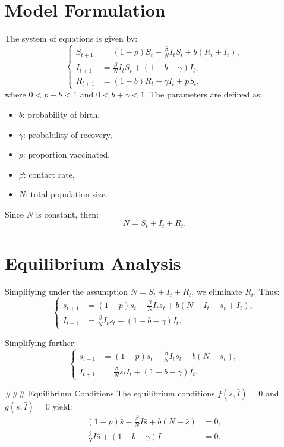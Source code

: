 \documentclass[10pt]{article}
\begin{document}
\section*{Model Formulation}

The system of equations is given by:
\[
\left\{
\begin{aligned}
S_{t+1} &= (1-p)S_t - \frac{\beta}{N}I_t S_t + b(R_t + I_t), \\
I_{t+1} &= \frac{\beta}{N}I_t S_t + (1-b-\gamma)I_t, \\
R_{t+1} &= (1-b)R_t + \gamma I_t + pS_t,
\end{aligned}
\right.
\]
where \( 0 < p+b < 1 \) and \( 0 < b + \gamma < 1 \). The parameters are defined as:
\begin{itemize}
    \item \( b \): probability of birth,
    \item \( \gamma \): probability of recovery,
    \item \( p \): proportion vaccinated,
    \item \( \beta \): contact rate,
    \item \( N \): total population size.
\end{itemize}
Since \( N \) is constant, then:
\[
N = S_t + I_t + R_t.
\]

\section*{Equilibrium Analysis}

Simplifying under the assumption \( N = S_t + I_t + R_t \), we eliminate \( R_t \). Thus:
\[
\left\{
\begin{aligned}
s_{t+1} &= (1-p)s_t - \frac{\beta}{N}I_t s_t + b(N - I_t - s_t + I_t), \\
I_{t+1} &= \frac{\beta}{N}I_t s_t + (1-b-\gamma)I_t.
\end{aligned}
\right.
\]

Simplifying further:
\[
\left\{
\begin{aligned}
s_{t+1} &= (1-p)s_t - \frac{\beta}{N}I_t s_t + b(N - s_t), \\
I_{t+1} &= \frac{\beta}{N}s_t I_t + (1-b-\gamma)I_t.
\end{aligned}
\right.
\]

### Equilibrium Conditions
The equilibrium conditions \( f(\bar{s}, \bar{I}) = 0 \) and \( g(\bar{s}, \bar{I}) = 0 \) yield:
\[
\begin{aligned}
(1-p)\bar{s} - \frac{\beta}{N}\bar{I}\bar{s} + b(N - \bar{s}) &= 0, \\
\frac{\beta}{N}\bar{I}\bar{s} + (1-b-\gamma)\bar{I} &= 0.
\end{aligned}
\]
\end{document}
